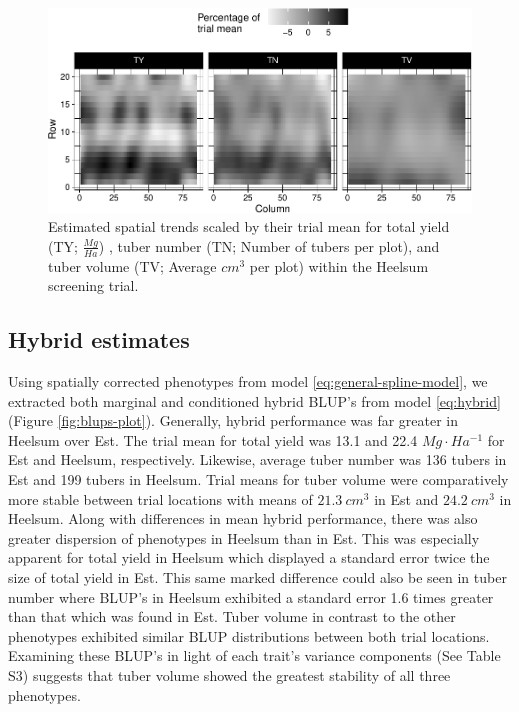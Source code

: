 \begin{figure}
\centering
\includegraphics[width=\linewidth]{./figs_02/Fig2.pdf}
\caption{\label{fig:trend-hee}Estimated spatial trends scaled by their trial mean for total yield (TY; \(\frac{Mg}{Ha}\)) , tuber number (TN; Number of tubers per plot), and tuber volume (TV; Average \(cm^3\) per plot) within the Heelsum screening trial.}
\end{figure}

\subsection{Hybrid estimates}\label{hybrid-estimates}

    Using spatially corrected phenotypes from model \eqref{eq:general-spline-model}, we extracted both marginal and conditioned hybrid BLUP's from model \eqref{eq:hybrid} (Figure \ref{fig:blups-plot}). Generally, hybrid performance was far greater in Heelsum over Est. The trial mean for total yield was 13.1 and 22.4 \(Mg \cdot Ha^{-1}\) for Est and Heelsum, respectively. Likewise, average tuber number was 136 tubers in Est and 199 tubers in Heelsum. Trial means for tuber volume were comparatively more stable between trial locations with means of \(21.3~cm^3\) in Est and \(24.2~cm^3\) in Heelsum. Along with differences in mean hybrid performance, there was also greater dispersion of phenotypes in Heelsum than in Est. This was especially apparent for total yield in Heelsum which displayed a standard error twice the size of total yield in Est. This same marked difference could also be seen in tuber number where BLUP's in Heelsum exhibited a standard error 1.6 times greater than that which was found in Est. Tuber volume in contrast to the other phenotypes exhibited similar BLUP distributions between both trial locations. Examining these BLUP's in light of each trait's variance components (See Table S3) suggests that tuber volume showed the greatest stability of all three phenotypes.

